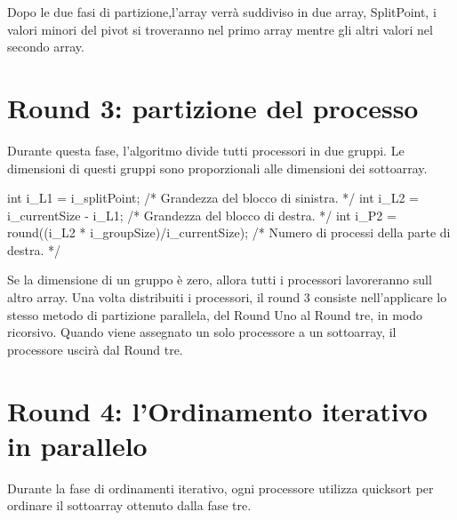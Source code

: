 Dopo le due fasi di partizione,l'array verrà suddiviso in due array, SplitPoint, i valori minori del pivot si troveranno nel primo array mentre gli altri valori nel secondo array.


\section{Round 3: partizione del processo}

Durante questa fase, l'algoritmo divide tutti processori in due gruppi.
Le dimensioni di questi gruppi sono proporzionali alle dimensioni dei sottoarray.

  int i\_L1 = i\_splitPoint; /* Grandezza del blocco di sinistra. */
  int i\_L2 = i\_currentSize - i\_L1; /* Grandezza del blocco di destra. */
  int i\_P2 = round((i\_L2 * i\_groupSize)/i\_currentSize); /* Numero di processi della parte di destra. */
    		

Se la dimensione di un gruppo è zero, allora tutti i processori lavoreranno sull altro array.
Una volta distribuiti i processori, il round 3 consiste nell'applicare lo stesso metodo di partizione parallela, del Round Uno al Round tre, in modo ricorsivo.
Quando viene assegnato un solo processore a un sottoarray, il processore uscirà dal Round tre.


\section{Round 4: l'Ordinamento iterativo in parallelo}

Durante la fase di ordinamenti iterativo, ogni processore utilizza quicksort per ordinare il sottoarray ottenuto dalla fase tre. 

